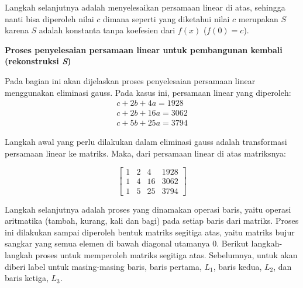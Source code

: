 Langkah selanjutnya adalah menyelesaikan persamaan linear di atas, sehingga nanti bisa diperoleh nilai \begin{math}c\end{math} dimana seperti yang diketahui nilai \begin{math}c\end{math} merupakan \begin{math}S\end{math} karena \begin{math}S\end{math} adalah konstanta tanpa koefesien dari \begin{math}f(x)\end{math} (\begin{math}f(0) = c\end{math}).

\begin{flushleft}
	\textbf{Proses penyelesaian persamaan linear untuk pembangunan kembali (rekonstruksi \textit{S})}
\end{flushleft}

Pada bagian ini akan dijelaskan proses penyelesaian persamaan linear menggunakan eliminasi gauss. Pada kasus ini, persamaan linear yang diperoleh:
\begin{gather*}
	c + 2b + 4a = 1928	\\
	c + 2b + 16a = 3062	\\
	c + 5b + 25a = 3794
\end{gather*}

Langkah awal yang perlu dilakukan dalam eliminasi gauss adalah transformasi persamaan linear ke matriks. Maka, dari persamaan linear di atas matriksnya:

\begin{center}
	\setlength\arraycolsep{15pt}
	\[
	\begin{bmatrix}
			1 & 	2 & 	4  & 	1928 \\[1em]
			1 & 	4 & 	16 & 	3062 \\[1em]
			1 & 	5 & 	25 & 	3794
	\end{bmatrix}
	\]
\end{center}

Langkah selanjutnya adalah proses yang dinamakan operasi baris, yaitu operasi aritmatika (tambah, kurang, kali dan bagi) pada setiap baris dari matriks. Proses ini dilakukan sampai diperoleh bentuk matriks segitiga atas, yaitu matriks bujur sangkar yang semua elemen di bawah diagonal utamanya 0. Berikut langkah-langkah proses untuk memperoleh matriks segitiga atas. Sebelumnya, untuk akan diberi label untuk masing-masing baris, baris pertama, \begin{math}L_1\end{math}, baris kedua, \begin{math}L_2\end{math}, dan baris ketiga, \begin{math}L_3\end{math}.

